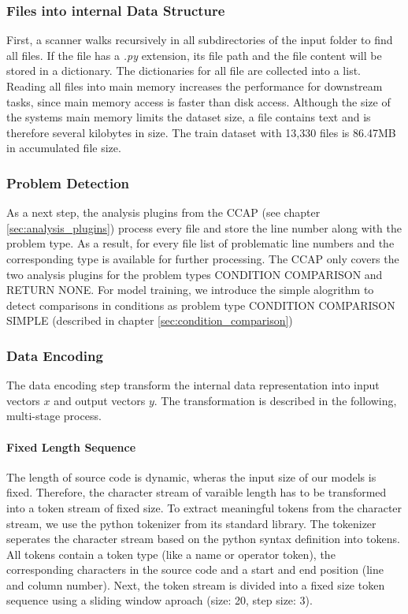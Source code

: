 \subsubsection{Files into internal Data Structure}
First, a scanner walks recursively in all subdirectories of the input folder to find all files. If the file has a \textit{.py} extension, its file path and the file content will be stored in a dictionary. The dictionaries for all file are collected into a list. 
Reading all files into main memory increases the performance for downstream tasks, since main memory access is faster than disk access. Although the size of the systems main memory limits the dataset size, a file contains text and is therefore several kilobytes in size. The train dataset with 13,330 files is 86.47MB in accumulated file size.

\subsubsection{Problem Detection}\label{sec:problem_detection}
As a next step, the analysis plugins from the CCAP (see chapter \ref{sec:analysis_plugins}) process every file and store the line number along with the problem type. As a result, for every file list of problematic line numbers and the corresponding type is available for further processing. The CCAP only covers the two analysis plugins for the problem types CONDITION COMPARISON and RETURN NONE. For model training, we introduce the simple alogrithm to detect comparisons in conditions as problem type CONDITION COMPARISON SIMPLE (described in chapter \ref{sec:condition_comparison})



\subsubsection{Data Encoding}\label{sec:data_encoding}
The data encoding step transform the internal data representation into input vectors $x$ and output vectors $y$. The transformation is described in the following, multi-stage process.

\paragraph{Fixed Length Sequence}
The length of source code is dynamic, wheras the input size of our models is fixed. Therefore, the character stream of varaible length has to be transformed into a token stream of fixed size. 
To extract meaningful tokens from the character stream, we use the python tokenizer from its standard library. The tokenizer seperates the character stream based on the python syntax definition into tokens. All tokens contain a token type (like a name or operator token), the corresponding characters in the source code and a start and end position (line and column number). Next, the token stream is divided into a fixed size token sequence using a sliding window aproach (size: 20, step size: 3).
